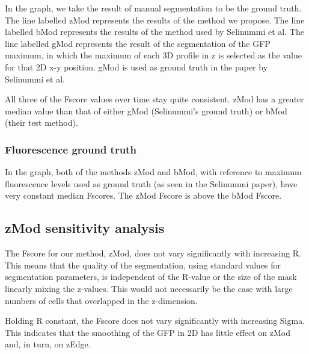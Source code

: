 
In the graph, we take the result of manual segmentation to be the ground truth. The line labelled zMod represents the results of the method we propose. The line labelled bMod represents the results of the method used by Selinummi et al. The line labelled gMod represents the result of the segmentation of the GFP maximum, in which the maximum of each 3D profile in z is selected as the value for that 2D x-y position. gMod is used as ground truth in the paper by Selinummi et al.

All three of the Fscore values over time stay quite consistent. zMod has a greater median value than that of either gMod (Selinummi's ground truth) or bMod (their test method).

\subsubsection{Fluorescence ground truth}


In the graph, both of the methods zMod and bMod, with reference to maximum fluorescence levels used as ground truth (as seen in the Selinummi paper), have very constant median Fscores. The zMod Fscore is above the bMod Fscore.

\subsection{zMod sensitivity analysis}


The Fscore for our method, zMod, does not vary significantly with increasing R. This means that the quality of the segmentation, using standard values for segmentation parameters, is independent of the R-value or the size of the mask linearly mixing the z-values. This would not necessarily be the case with large numbers of cells that overlapped in the z-dimension.


Holding R constant, the Fscore does not vary significantly with increasing Sigma. This indicates that the smoothing of the GFP in 2D has little effect on zMod and, in turn, on zEdge.
